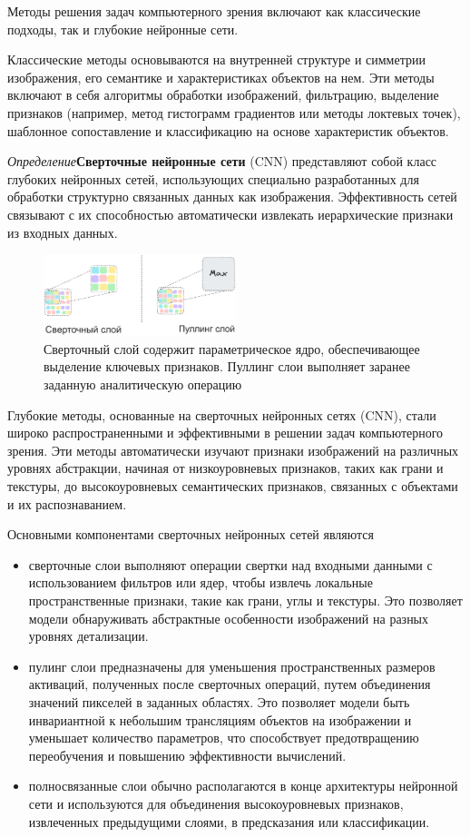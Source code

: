 
Методы решения задач компьютерного зрения включают как классические подходы, так и глубокие нейронные сети.

Классические методы основываются на внутренней структуре и симметрии изображения, 
его семантике и характеристиках объектов на нем. 
Эти методы включают в себя алгоритмы обработки изображений,
 фильтрацию, выделение признаков (например, метод гистограмм градиентов или методы локтевых точек),
  шаблонное сопоставление и классификацию на основе характеристик объектов.

\textit{Определение}\textbf{Сверточные нейронные сети} (CNN)\cite{lecun1989handwritten} представляют собой класс глубоких нейронных сетей,
использующих
специально разработанных для обработки структурно связанных данных как изображения. 
Эффективность сетей связывают с их способностью автоматически извлекать иерархические признаки из входных данных.


\begin{figure}[h]
    \centering
    \includegraphics[width=0.5\textwidth]{assets/ml/cv/conv.excalidraw.png}
    \caption{Сверточный слой содержит параметрическое ядро, обеспечивающее выделение ключевых признаков. Пуллинг слои выполняет заранее заданную аналитическую операцию}
    \label{cnn}
\end{figure}

Глубокие методы, основанные на сверточных нейронных сетях (CNN), 
стали широко распространенными и эффективными в решении задач компьютерного зрения. 
Эти методы автоматически изучают признаки изображений на различных уровнях абстракции, 
начиная от низкоуровневых признаков, таких как грани и текстуры, до высокоуровневых семантических признаков,
 связанных с объектами и их распознаванием. 
 
Основными компонентами сверточных нейронных сетей являются \begin{itemize}
    \item сверточные слои выполняют операции свертки над входными данными с использованием фильтров или ядер, 
    чтобы извлечь локальные пространственные признаки, такие как грани, углы и текстуры. 
    Это позволяет модели обнаруживать абстрактные особенности изображений на разных уровнях детализации.
    \item пулинг слои предназначены для уменьшения пространственных размеров активаций, полученных после сверточных операций, путем объединения значений пикселей в заданных областях. 
    Это позволяет модели быть инвариантной к небольшим трансляциям объектов на изображении и уменьшает количество параметров, 
    что способствует предотвращению переобучения и повышению эффективности вычислений.
    \item полносвязанные слои обычно располагаются в конце архитектуры нейронной сети и используются для объединения высокоуровневых признаков, 
    извлеченных предыдущими слоями, в предсказания или классификации.
\end{itemize}
 
